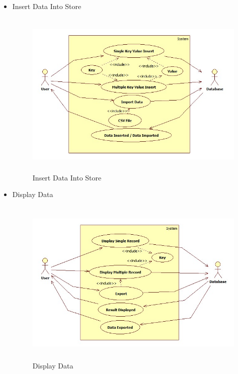 \newpage
\begin{itemize}
  \item Insert Data Into Store
\begin{figure}[h]
\centering
  \includegraphics[width=11.5cm,height=8cm]{Fig2.jpg}
  \caption{Insert Data Into Store}\label{Insert Data Into Store}
\end{figure}
\end{itemize}

\begin{itemize}
  \item Display Data
\begin{figure}[h]
\centering
  \includegraphics[width=11.5cm,height=8cm]{Fig3.jpg}
  \caption{Display Data}\label{Display Data}
\end{figure}
\end{itemize}


